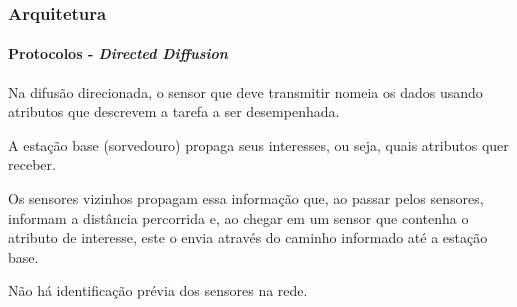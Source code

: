 \documentclass[notes]{beamer}
\begin{document}
\begin{frame}
\label{slide_49}
\frametitle{Arquitetura}
\framesubtitle{Protocolos - \textit{Directed Diffusion}}

\begin{block}

Na difusão direcionada, o sensor que deve transmitir nomeia os dados usando atributos que descrevem a tarefa a ser desempenhada.

\end{block} \pause

\begin{block}

A estação base (sorvedouro) propaga seus interesses, ou seja, quais atributos quer receber. 
\end{block} \pause

\begin{block}

Os sensores vizinhos propagam essa informação que, ao passar pelos sensores, informam a distância percorrida e, ao chegar em um sensor que contenha o atributo de interesse, este o envia através do caminho informado até a estação base.

\end{block} \pause

\begin{block}

Não há identificação prévia dos sensores na rede. 

\end{block} 

\end{frame}
\end{document}
